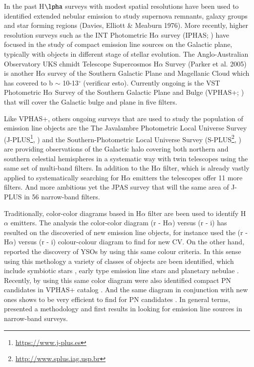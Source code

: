 \documentclass[fleqn,usenatbib]{mnras}
\begin{document}
In the past H$\lpha$ surveys with modest spatial resolutions have been used
to identified extended nebular emission to study supernova remnants, galaxy
groups and star forming regions (Davies, Elliott & Meaburn 1976). More recently,
higher resolution surveys such as the INT Photometric H$\alpha$ survey
(IPHAS; \citealt{Drew:2005, Barentsen:2014}) have focused in the study of
compact emission line sources on the Galactic plane, typically with objects
in different stage of stellar evolution. The Anglo-Australian Observatory UKS
chmidt Telescope Supercosmos H$\alpha$ Survey (Parker et al. 2005) is another
H{$\alpha$} survey of the Southern Galactic Plane and Magellanic Cloud which
has covered to b $\sim$ 10-13$^{\circ}$ (verificar esto). Currently ongoing is
the VST Photometric H$\alpha$ Survey of the Southern Galactic Plane and Bulge
(VPHAS+; \citealt{Drew:2014}) that will cover the Galactic bulge and plane in
five filters. 

Like VPHAS+, others ongoing surveys that are used to study the population of
emission line objects are the The Javalambre Photometric Local Universe Survey
(J-PLUS\footnote{\url{https://www.j-plus.es}}, \citealp{Cenarro:2018})
and the Southern-Photometric Local Universe Survey
(S-PLUS\footnote{\url{http://www.splus.iag.usp.br}}, \citealp{Mendes:2019})
are providing observations of the Galactic halo covering both northern and
southern celestial hemispheres in a systematic way with twin telescopes
using the same set of multi-band filters. In addition to the H$\alpha$ filter,
which is already vastly applied to systematically searching for H$\alpha$ emitters
the telescopes offer 11 more filters. And more ambitious yet the JPAS survey that
will the same area of J-PLUS in 56 narrow-band filters.

Traditionally, color-color diagrams based in H$\alpha$ filter are been used to
identify H$\alpha$ emitters.  The analysis the color-color diagram  (r - H$\alpha$)
versus (r - i) has resulted on the discoveried of new emission line objects, for
instance \citet{Witham:2006, Witham:2007}  used the (r - H$\alpha$) versus (r - i)
colour-colour diagram to find for new CV. On the other hand, \citet{Vink:2008}
reported the discovery of YSOs by using this same colour criteria. In this sense using
this methology a variety of classes of objects are been identified, which include
symbiotic stars \citep{Corradi:2008, Corradi:2010, Corradi:2011}, early type emission
line stars \citep{Drew:2008} and planetary nebulae \citep{Viirone:2009, Sabin:2010}.
Recently, by using this same color diagram were also identified compact PN candidates
in VPHAS+ catalog \citep{Akras:2019}. And the same diagram in conjunction with new
ones shows to be very efficient to find for PN candidates \citep{Gutierrez:2020}.
In general terms, \citet{Witham:2006} presented a methodology and first results
in looking for emission line sources in narrow-band surveys.
\end{document}
